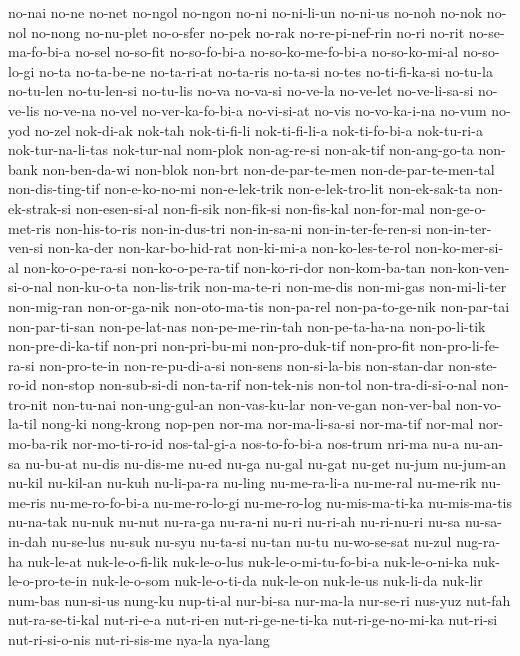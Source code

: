 {no-nai no-ne no-net no-ngol no-ngon no-ni no-ni-li-un no-ni-us no-noh
no-nok no-nol no-nong no-nu-plet no-o-sfer no-pek no-rak no-re-pi-nef-rin
no-ri no-rit no-se-ma-fo-bi-a no-sel no-so-fit no-so-fo-bi-a
no-so-ko-me-fo-bi-a no-so-ko-mi-al no-so-lo-gi no-ta no-ta-be-ne
no-ta-ri-at no-ta-ris no-ta-si no-tes no-ti-fi-ka-si no-tu-la no-tu-len
no-tu-len-si no-tu-lis no-va no-va-si no-ve-la no-ve-let no-ve-li-sa-si
no-ve-lis no-ve-na no-vel no-ver-ka-fo-bi-a no-vi-si-at no-vis
no-vo-ka-i-na no-vum no-yod no-zel nok-di-ak nok-tah nok-ti-fi-li
nok-ti-fi-li-a nok-ti-fo-bi-a nok-tu-ri-a nok-tur-na-li-tas nok-tur-nal
nom-plok non-ag-re-si non-ak-tif non-ang-go-ta non-bank non-ben-da-wi
non-blok non-brt non-de-par-te-men non-de-par-te-men-tal non-dis-ting-tif
non-e-ko-no-mi non-e-lek-trik non-e-lek-tro-lit non-ek-sak-ta
non-ek-strak-si non-esen-si-al non-fi-sik non-fik-si non-fis-kal
non-for-mal non-ge-o-met-ris non-his-to-ris non-in-dus-tri non-in-sa-ni
non-in-ter-fe-ren-si non-in-ter-ven-si non-ka-der non-kar-bo-hid-rat
non-ki-mi-a non-ko-les-te-rol non-ko-mer-si-al non-ko-o-pe-ra-si
non-ko-o-pe-ra-tif non-ko-ri-dor non-kom-ba-tan non-kon-ven-si-o-nal
non-ku-o-ta non-lis-trik non-ma-te-ri non-me-dis non-mi-gas non-mi-li-ter
non-mig-ran non-or-ga-nik non-oto-ma-tis non-pa-rel non-pa-to-ge-nik
non-par-tai non-par-ti-san non-pe-lat-nas non-pe-me-rin-tah
non-pe-ta-ha-na non-po-li-tik non-pre-di-ka-tif non-pri non-pri-bu-mi
non-pro-duk-tif non-pro-fit non-pro-li-fe-ra-si non-pro-te-in
non-re-pu-di-a-si non-sens non-si-la-bis non-stan-dar non-ste-ro-id
non-stop non-sub-si-di non-ta-rif non-tek-nis non-tol non-tra-di-si-o-nal
non-tro-nit non-tu-nai non-ung-gul-an non-vas-ku-lar non-ve-gan
non-ver-bal non-vo-la-til nong-ki nong-krong nop-pen nor-ma
nor-ma-li-sa-si nor-ma-tif nor-mal nor-mo-ba-rik nor-mo-ti-ro-id
nos-tal-gi-a nos-to-fo-bi-a nos-trum nri-ma nu-a nu-an-sa nu-bu-at nu-dis
nu-dis-me nu-ed nu-ga nu-gal nu-gat nu-get nu-jum nu-jum-an nu-kil
nu-kil-an nu-kuh nu-li-pa-ra nu-ling nu-me-ra-li-a nu-me-ral nu-me-rik
nu-me-ris nu-me-ro-fo-bi-a nu-me-ro-lo-gi nu-me-ro-log nu-mis-ma-ti-ka
nu-mis-ma-tis nu-na-tak nu-nuk nu-nut nu-ra-ga nu-ra-ni nu-ri nu-ri-ah
nu-ri-nu-ri nu-sa nu-sa-in-dah nu-se-lus nu-suk nu-syu nu-ta-si nu-tan
nu-tu nu-wo-se-sat nu-zul nug-ra-ha nuk-le-at nuk-le-o-fi-lik nuk-le-o-lus
nuk-le-o-mi-tu-fo-bi-a nuk-le-o-ni-ka nuk-le-o-pro-te-in nuk-le-o-som
nuk-le-o-ti-da nuk-le-on nuk-le-us nuk-li-da nuk-lir num-bas nun-si-us
nung-ku nup-ti-al nur-bi-sa nur-ma-la nur-se-ri nus-yuz nut-fah
nut-ra-se-ti-kal nut-ri-e-a nut-ri-en nut-ri-ge-ne-ti-ka
nut-ri-ge-no-mi-ka nut-ri-si nut-ri-si-o-nis nut-ri-sis-me nya-la nya-lang
}
